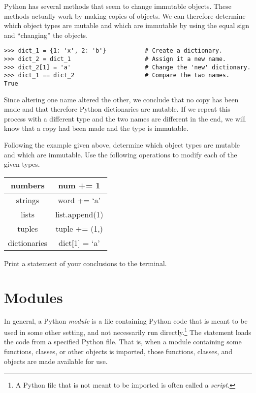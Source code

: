 \begin{problem}
Python has several methods that seem to change immutable objects.
These methods actually work by making copies of objects.
We can therefore determine which object types are mutable and which are immutable by using the equal sign and ``changing'' the objects.

\begin{lstlisting}
>>> dict_1 = {1: 'x', 2: 'b'}           # Create a dictionary.
>>> dict_2 = dict_1                     # Assign it a new name.
>>> dict_2[1] = 'a'                     # Change the 'new' dictionary.
>>> dict_1 == dict_2                    # Compare the two names.
True
\end{lstlisting}

Since altering one name altered the other, we conclude that no copy has been made and that therefore Python dictionaries are mutable.
If we repeat this process with a different type and the two names are different in the end, we will know that a copy had been made and the type is immutable.

Following the example given above, determine which object types are mutable and which are immutable.
Use the following operations to modify each of the given types.

\begin{center}
\begin{tabular}{|c|c|}
\hline
numbers & num += 1 \\
\hline
strings & word += `a' \\
\hline
lists & list.append(1) \\
\hline
tuples & tuple += (1,) \\
\hline
dictionaries & dict[1] = `a' \\
\hline
\end{tabular}
\end{center}
Print a statement of your conclusions to the terminal.
\end{problem}

\section*{Modules}

In general, a Python \emph{module} is a file containing Python code that is meant to be used in some other setting, and not necessarily run directly.\footnote{A Python file that is not meant to be imported is often called a \emph{script}.}
The  statement loads the code from a specified Python file.
That is, when a module containing some functions, classes, or other objects is imported, those functions, classes, and objects are made available for use.%

